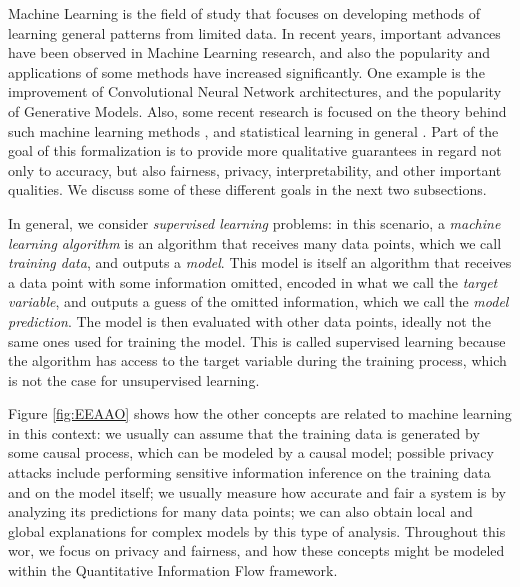 \documentclass[conference]{IEEEtran}
\begin{document}
Machine Learning is the field of study that focuses on developing methods of learning general patterns from limited data. In recent years, important advances have been observed in Machine Learning research, and also the popularity and applications of some methods have increased significantly. One example is the improvement of Convolutional Neural Network architectures, and the popularity of Generative Models. Also, some recent research is focused on the theory behind such machine learning methods \cite{SAAMAP}\cite{grohs2022mathematical}, and statistical learning in general \cite{Vapnik}. Part of the goal of this formalization is to provide more qualitative guarantees in regard not only to accuracy, but also fairness, privacy, interpretability, and other important qualities. We discuss some of these different goals in the next two subsections.

In general, we consider \emph{supervised learning} problems: in this scenario, a \emph{machine learning algorithm} is an algorithm that receives many data points, which we call \emph{training data}, and outputs a \emph{model}. This model is itself an algorithm that receives a data point with some information omitted, encoded in what we call the \emph{target variable}, and outputs a guess of the omitted information, which we call the \emph{model prediction}. The model is then evaluated with other data points, ideally not the same ones used for training the model. This is called supervised learning because the algorithm has access to the target variable during the training process, which is not the case for unsupervised learning.

Figure \ref{fig:EEAAO} shows how the other concepts are related to machine learning in this context: we usually can assume that the training data is generated by some causal process, which can be modeled by a causal model; possible privacy attacks include performing sensitive information inference on the training data and on the model itself; we usually measure how accurate and fair a system is by analyzing its predictions for many data points; we can also obtain local and global explanations for complex models by this type of analysis. Throughout this wor, we focus on privacy and fairness, and how these concepts might be modeled within the Quantitative Information Flow framework.
\end{document}
